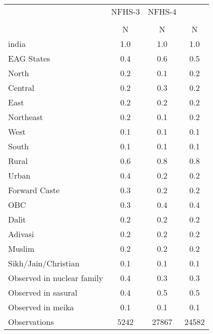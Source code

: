 {
\def\sym#1{\ifmmode^{#1}\else\(^{#1}\)\fi}
\begin{tabular}{l*{3}{c}}
\toprule
                    &      NFHS-3&      NFHS-4&            \\
                    &\multicolumn{1}{c}{}&\multicolumn{1}{c}{}&\multicolumn{1}{c}{}\\
                    &           N&           N&           N\\
\midrule
india               &         1.0&         1.0&         1.0\\
EAG States          &         0.4&         0.6&         0.5\\
North               &         0.2&         0.1&         0.2\\
Central             &         0.2&         0.3&         0.2\\
East                &         0.2&         0.2&         0.2\\
Northeast           &         0.2&         0.1&         0.2\\
West                &         0.1&         0.1&         0.1\\
South               &         0.1&         0.1&         0.1\\
Rural               &         0.6&         0.8&         0.8\\
Urban               &         0.4&         0.2&         0.2\\
Forward Caste       &         0.3&         0.2&         0.2\\
OBC                 &         0.3&         0.4&         0.4\\
Dalit               &         0.2&         0.2&         0.2\\
Adivasi             &         0.2&         0.2&         0.2\\
Muslim              &         0.2&         0.2&         0.2\\
Sikh/Jain/Christian &         0.1&         0.1&         0.1\\
Observed in nuclear family&         0.4&         0.3&         0.3\\
Observed in sasural &         0.4&         0.5&         0.5\\
Observed in meika   &         0.1&         0.1&         0.1\\
\midrule
Observations        &        5242&       27867&       24582\\
\bottomrule
\end{tabular}
}
